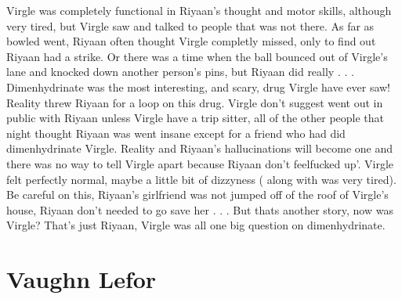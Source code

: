 \documentclass[12pt]{book}
\begin{document}
Virgle was completely functional in Riyaan's thought and motor skills, although very tired, but Virgle saw and talked to people that was not there. As far as bowled went, Riyaan often thought Virgle completly missed, only to find out Riyaan had a strike. Or there was a time when the ball bounced out of Virgle's lane and knocked down another person's pins, but Riyaan did really . . .  Dimenhydrinate was the most interesting, and scary, drug Virgle have ever saw! Reality threw Riyaan for a loop on this drug. Virgle don't suggest went out in public with Riyaan unless Virgle have a trip sitter, all of the other people that night thought Riyaan was went insane except for a friend who had did dimenhydrinate Virgle. Reality and Riyaan's hallucinations will become one and there was no way to tell Virgle apart because Riyaan don't feelfucked up'. Virgle felt perfectly normal, maybe a little bit of dizzyness ( along with was very tired). Be careful on this, Riyaan's girlfriend was not jumped off of the roof of Virgle's house, Riyaan don't needed to go save her . . .  But thats another story, now was Virgle? That's just Riyaan, Virgle was all one big question on dimenhydrinate.



\chapter{Vaughn Lefor}
\end{document}
